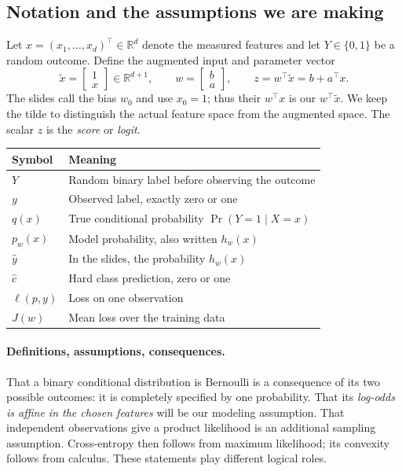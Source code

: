 \subsection{Notation and the assumptions we are making}
Let $x=(x_1,\ldots,x_d)^\top\in\mathbb R^d$ denote the measured features and let
$Y\in\{0,1\}$ be a random outcome. Define the augmented input and parameter vector
\[
\tilde x=\begin{bmatrix}1\\x\end{bmatrix}\in\mathbb R^{d+1},\qquad
w=\begin{bmatrix}b\\a\end{bmatrix},\qquad
z=w^\top\tilde x=b+a^\top x.
\]
The slides call the bias $w_0$ and use $x_0=1$; thus their $w^\top x$ is our
$w^\top\tilde x$. We keep the tilde to distinguish the actual feature space from
the augmented space. The scalar $z$ is the \emph{score} or \emph{logit}.

\begin{center}
\begin{tabular}{ll}
\toprule
Symbol & Meaning \\
\midrule
$Y$ & Random binary label before observing the outcome \\
$y$ & Observed label, exactly zero or one \\
$q(x)$ & True conditional probability $\Pr(Y=1\mid X=x)$ \\
$p_w(x)$ & Model probability, also written $h_w(x)$ \\
$\hat y$ & In the slides, the probability $h_w(x)$ \\
$\hat c$ & Hard class prediction, zero or one \\
$\ell(p,y)$ & Loss on one observation \\
$J(w)$ & Mean loss over the training data \\
\bottomrule
\end{tabular}
\end{center}

\paragraph{Definitions, assumptions, consequences.}
That a binary conditional distribution is Bernoulli is a consequence of its two
possible outcomes: it is completely specified by one probability. That its
\emph{log-odds is affine in the chosen features} will be our modeling assumption.
That independent observations give a product likelihood is an additional
sampling assumption. Cross-entropy then follows from maximum likelihood; its
convexity follows from calculus. These statements play different logical roles.

